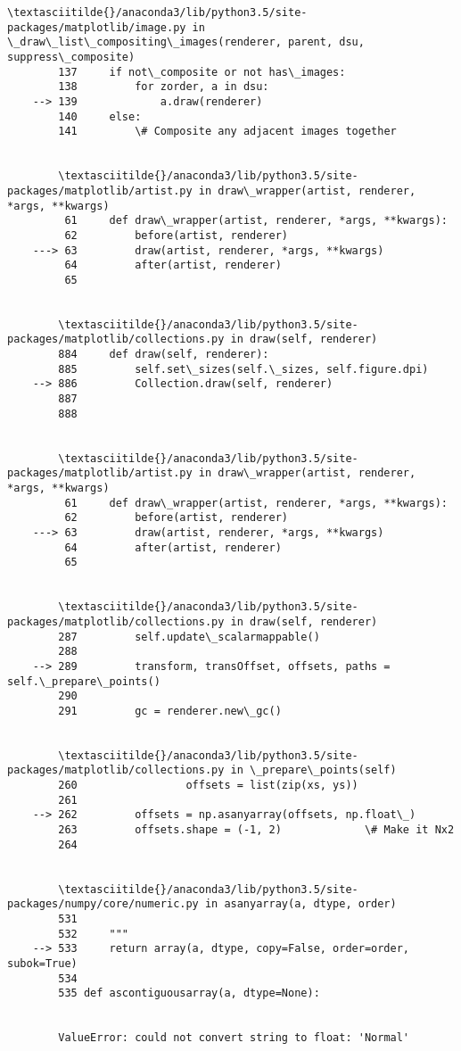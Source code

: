 \documentclass[11pt]{article}
\begin{document}
\begin{Verbatim}[commandchars=\\\{\}]
        \textasciitilde{}/anaconda3/lib/python3.5/site-packages/matplotlib/image.py in \_draw\_list\_compositing\_images(renderer, parent, dsu, suppress\_composite)
        137     if not\_composite or not has\_images:
        138         for zorder, a in dsu:
    --> 139             a.draw(renderer)
        140     else:
        141         \# Composite any adjacent images together


        \textasciitilde{}/anaconda3/lib/python3.5/site-packages/matplotlib/artist.py in draw\_wrapper(artist, renderer, *args, **kwargs)
         61     def draw\_wrapper(artist, renderer, *args, **kwargs):
         62         before(artist, renderer)
    ---> 63         draw(artist, renderer, *args, **kwargs)
         64         after(artist, renderer)
         65 


        \textasciitilde{}/anaconda3/lib/python3.5/site-packages/matplotlib/collections.py in draw(self, renderer)
        884     def draw(self, renderer):
        885         self.set\_sizes(self.\_sizes, self.figure.dpi)
    --> 886         Collection.draw(self, renderer)
        887 
        888 


        \textasciitilde{}/anaconda3/lib/python3.5/site-packages/matplotlib/artist.py in draw\_wrapper(artist, renderer, *args, **kwargs)
         61     def draw\_wrapper(artist, renderer, *args, **kwargs):
         62         before(artist, renderer)
    ---> 63         draw(artist, renderer, *args, **kwargs)
         64         after(artist, renderer)
         65 


        \textasciitilde{}/anaconda3/lib/python3.5/site-packages/matplotlib/collections.py in draw(self, renderer)
        287         self.update\_scalarmappable()
        288 
    --> 289         transform, transOffset, offsets, paths = self.\_prepare\_points()
        290 
        291         gc = renderer.new\_gc()


        \textasciitilde{}/anaconda3/lib/python3.5/site-packages/matplotlib/collections.py in \_prepare\_points(self)
        260                 offsets = list(zip(xs, ys))
        261 
    --> 262         offsets = np.asanyarray(offsets, np.float\_)
        263         offsets.shape = (-1, 2)             \# Make it Nx2
        264 


        \textasciitilde{}/anaconda3/lib/python3.5/site-packages/numpy/core/numeric.py in asanyarray(a, dtype, order)
        531 
        532     """
    --> 533     return array(a, dtype, copy=False, order=order, subok=True)
        534 
        535 def ascontiguousarray(a, dtype=None):


        ValueError: could not convert string to float: 'Normal'

    \end{Verbatim}
\end{document}
